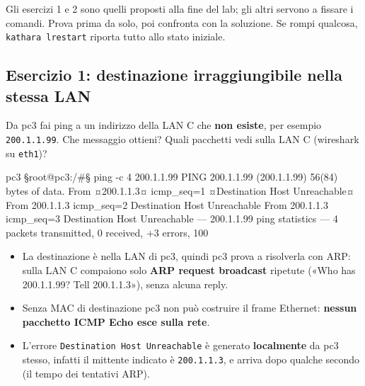 
Gli esercizi 1 e 2 sono quelli proposti alla fine del lab; gli altri servono a fissare i comandi. Prova prima da solo, poi confronta con la soluzione. Se rompi qualcosa, \texttt{kathara lrestart} riporta tutto allo stato iniziale.

\subsection{Esercizio 1: destinazione irraggiungibile nella stessa LAN}
\begin{esempio}[Consegna]
Da pc3 fai ping a un indirizzo della LAN C che \textbf{non esiste}, per esempio \texttt{200.1.1.99}. Che messaggio ottieni? Quali pacchetti vedi sulla LAN C (wireshark su \texttt{eth1})?
\end{esempio}
\begin{terminale}{pc3}
§root@pc3:/#§ ping -c 4 200.1.1.99
PING 200.1.1.99 (200.1.1.99) 56(84) bytes of data.
From ¤200.1.1.3¤ icmp_seq=1 ¤Destination Host Unreachable¤
From 200.1.1.3 icmp_seq=2 Destination Host Unreachable
From 200.1.1.3 icmp_seq=3 Destination Host Unreachable
--- 200.1.1.99 ping statistics ---
4 packets transmitted, 0 received, +3 errors, 100%
\end{terminale}
\begin{tecnica}[Soluzione]
\begin{itemize}
  \item La destinazione è nella LAN di pc3, quindi pc3 prova a risolverla con ARP: sulla LAN C compaiono solo \textbf{ARP request broadcast} ripetute («Who has 200.1.1.99? Tell 200.1.1.3»), senza alcuna reply.
  \item Senza MAC di destinazione pc3 non può costruire il frame Ethernet: \textbf{nessun pacchetto ICMP Echo esce sulla rete}.
  \item L'errore \texttt{Destination Host Unreachable} è generato \textbf{localmente} da pc3 stesso, infatti il mittente indicato è \texttt{200.1.1.3}, e arriva dopo qualche secondo (il tempo dei tentativi ARP).
\end{itemize}
\end{tecnica}

